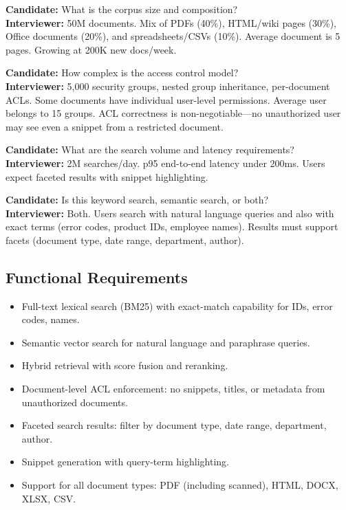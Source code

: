 \textbf{Candidate:} What is the corpus size and composition?\\
\textbf{Interviewer:} 50M documents. Mix of PDFs (40\%), HTML/wiki pages (30\%), Office documents (20\%), and spreadsheets/CSVs (10\%). Average document is 5 pages. Growing at 200K new docs/week.

\textbf{Candidate:} How complex is the access control model?\\
\textbf{Interviewer:} 5,000 security groups, nested group inheritance, per-document ACLs. Some documents have individual user-level permissions. Average user belongs to 15 groups. ACL correctness is non-negotiable---no unauthorized user may see even a snippet from a restricted document.

\textbf{Candidate:} What are the search volume and latency requirements?\\
\textbf{Interviewer:} 2M searches/day. p95 end-to-end latency under 200ms. Users expect faceted results with snippet highlighting.

\textbf{Candidate:} Is this keyword search, semantic search, or both?\\
\textbf{Interviewer:} Both. Users search with natural language queries and also with exact terms (error codes, product IDs, employee names). Results must support facets (document type, date range, department, author).

\subsection*{Functional Requirements}

\begin{itemize}
  \item Full-text lexical search (BM25) with exact-match capability for IDs, error codes, names.
  \item Semantic vector search for natural language and paraphrase queries.
  \item Hybrid retrieval with score fusion and reranking.
  \item Document-level ACL enforcement: no snippets, titles, or metadata from unauthorized documents.
  \item Faceted search results: filter by document type, date range, department, author.
  \item Snippet generation with query-term highlighting.
  \item Support for all document types: PDF (including scanned), HTML, DOCX, XLSX, CSV.
\end{itemize}

